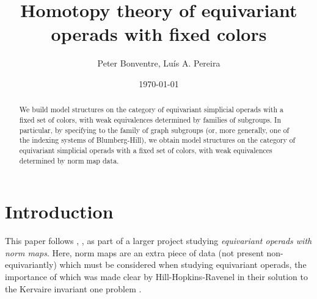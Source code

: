 \documentclass[a4paper,10pt
]{article}%
\title{Homotopy theory of equivariant operads with fixed colors}
\author{Peter Bonventre, Lu\'is A. Pereira}%
\date{\today}
\numberwithin{equation}{section}
\numberwithin{figure}{section}
\theoremstyle{definition} %
\newcommand{\1}{\ensuremath{\mathbbm 1}}%
\begin{document}
\maketitle

\begin{abstract}
	We build model structures 
	on the category of equivariant simplicial operads with a fixed set of colors,
	with weak equivalences determined by families of subgroups.
	In particular, by specifying to the family of graph subgroups 
	(or, more generally, one of the indexing systems of Blumberg-Hill),
	we obtain model structures on the category of equivariant simplicial operads with a fixed set of colors,
	with weak equivalences determined by norm map data.
\end{abstract}



\tableofcontents







\section{Introduction}

This paper follows \cite{Per18}, \cite{BP21}, \cite{BP20}
as part of a larger project studying 
\emph{equivariant operads with norm maps}.
Here, norm maps are an extra piece of data 
(not present non-equivariantly)
which must be considered
when studying equivariant operads,
the importance of which was made clear by
Hill-Hopkins-Ravenel 
in their solution to the Kervaire invariant one problem \cite{HHR16}.
\end{document}
